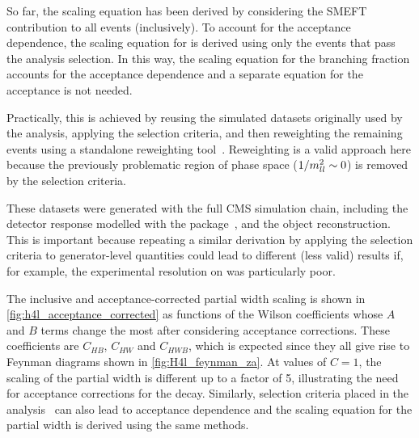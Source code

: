 So far, the \Hfl scaling equation has been derived by considering the SMEFT contribution to all \Hfl events (inclusively). To account for the acceptance dependence, the scaling equation for \Hfl is derived using only the events that pass the analysis selection. In this way, the scaling equation for the \Hfl branching fraction accounts for the acceptance dependence and a separate equation for the acceptance is not needed. 

Practically, this is achieved by reusing the simulated datasets originally used by the analysis, applying the selection criteria, and then reweighting the remaining events using a standalone reweighting tool~\cite{nanoAODtools,Mattelaer:2016gcx}. Reweighting is a valid approach here because the previously problematic region of phase space ($1/m_{ll}^2 \sim 0$) is removed by the selection criteria. 

These datasets were generated with the full CMS simulation chain, including the detector response modelled with the \GEANTfour package~\cite{Agostinelli:2002hh}, and the object reconstruction. This is important because repeating a similar derivation by applying the selection criteria to generator-level quantities could lead to different (less valid) results if, for example, the experimental resolution on \mthreefour was particularly poor. 

The inclusive and acceptance-corrected \Hfl partial width scaling is shown in \cref{fig:h4l_acceptance_corrected} as functions of the Wilson coefficients whose $A$ and $B$ terms change the most after considering acceptance corrections. These coefficients are $C_{HB}$, $C_{HW}$ and $C_{HWB}$, which is expected since they all give rise to Feynman diagrams shown in \cref{fig:H4l_feynman_za}. At values of $C = 1$, the scaling of the partial width is different up to a factor of 5, illustrating the need for acceptance corrections for the \Hfl decay. Similarly, selection criteria placed in the \Hlnulnu analysis~\cite{CMS:2022uhn} can also lead to acceptance dependence and the scaling equation for the \Hlnulnu partial width is derived using the same methods.

